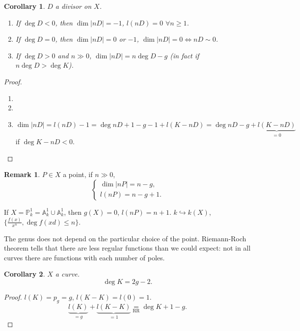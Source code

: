 \documentclass[12pt]{article}
\newtheorem*{corollary}{Corollary}
\theoremstyle{definition}
\newtheorem*{remark}{Remark}
\begin{document}
\begin{corollary}
$D$ a divisor on $X$.

\begin{enumerate}[label=\arabic*)]
\item If $\deg D<0$, then $\dim|nD|=-1$, $l(nD)=0$ $\forall n\geq1$.

\item If $\deg D=0$, then $\dim|nD|=0$ or $-1$, $\dim|nD|=0\Leftrightarrow nD\sim0$.

\item If $\deg D>0$ and $n\gg0$, $\dim|nD|=n\deg D-g$ (in fact if $n\deg D>\deg K$).
\end{enumerate}
\end{corollary}

\begin{proof}
\begin{enumerate}[label=\arabic*)]
\item \checkmark

\item \checkmark

\item
\[\dim|nD|=l(nD)-1=\deg nD+1-g-1+l(K-nD)=\deg nD-g+\underbrace{l(K-nD)}_{=0}\]
if $\deg K-nD<0$.
\end{enumerate}
\end{proof}

\begin{remark}
$P\in X$ a point, if $n\gg0$,
\[\left\{\begin{array}{l}\dim|nP|=n-g,\\l(nP)=n-g+1.\end{array}\right.\]
\end{remark}

If $X=\mathbb P_k^1=\mathbb A_k^1\cup\mathbb A_k^1$, then $g(X)=0$, $l(nP)=n+1$. $k\hookrightarrow k(X)$, $\{\frac{f(x)}{x^n},\deg f(xd)\leq n\}$.

The genus does not depend on the particular choice of the point. Riemann-Roch theorem tells that there are less regular functions than we could expect: not in all curves there are functions with each number of poles.

\begin{corollary}
$X$ a curve.
\[\deg K=2g-2.\]
\end{corollary}

\begin{proof}
$l(K)=p_g=g$, $l(K-K)=l(0)=1$.
\[\underbrace{l(K)}_{=g}+\underbrace{l(K-K)}_{=1}\underset{\text{RR}}=\deg K+1-g.\]
\end{proof}
\end{document}
